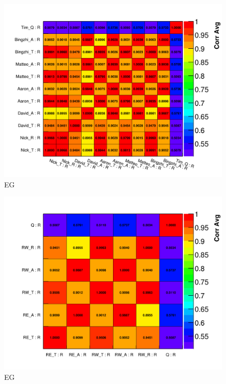 \begin{figure}[]
\centering
\includegraphics[width=\textwidth]{Avg_CorrelationMatrix_R_R}
\caption{EG}
\label{fig:}
\end{figure}

\begin{figure}[]
\centering
\includegraphics[width=\textwidth]{Avg_Recon_CorrelationMatrix_R_R}
\caption{EG}
\label{fig:}
\end{figure}



